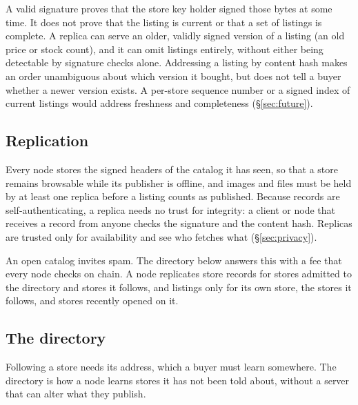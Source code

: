 A valid signature proves that the store key holder signed those bytes at some time. It does not prove that the listing is current or that a set of listings is complete. A replica can serve an older, validly signed version of a listing (an old price or stock count), and it can omit listings entirely, without either being detectable by signature checks alone. Addressing a listing by content hash makes an order unambiguous about which version it bought, but does not tell a buyer whether a newer version exists. A per-store sequence number or a signed index of current listings would address freshness and completeness (\S\ref{sec:future}).

\subsection{Replication}

Every node stores the signed headers of the catalog it has seen, so that a store remains browsable while its publisher is offline, and images and files must be held by at least one replica before a listing counts as published. Because records are self-authenticating, a replica needs no trust for integrity: a client or node that receives a record from anyone checks the signature and the content hash. Replicas are trusted only for availability and see who fetches what (\S\ref{sec:privacy}).

An open catalog invites spam. The directory below answers this with a fee that every node checks on chain. A node replicates store records for stores admitted to the directory and stores it follows, and listings only for its own store, the stores it follows, and stores recently opened on it.

\subsection{The directory}
\label{sec:directory}

Following a store needs its address, which a buyer must learn somewhere. The directory is how a node learns stores it has not been told about, without a server that can alter what they publish.

